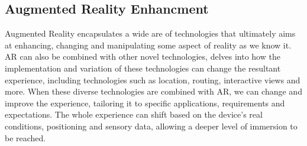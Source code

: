 \subsection{Augmented Reality Enhancment}
Augmented Reality encapsulates a wide are of technologies that ultimately aims at enhancing, changing and manipulating some aspect of reality as we know it. AR can also be combined with other novel technologies, 
\cite{Keckes2017} delves into how the implementation and variation of these technologies can change the resultant experience, including technologies such as location, routing, interactive views and more. 
\noindent
When these diverse technologies are combined with AR, we can change and improve the experience, tailoring it to specific applications, requirements and expectations. 
The whole experience can shift based on the device's real conditions, positioning and sensory data, allowing a deeper level of immersion to be reached. 


